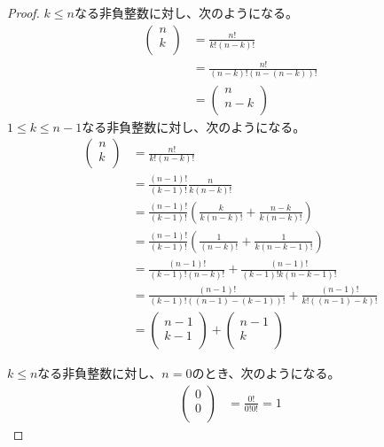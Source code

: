 \documentclass[dvipdfmx]{jsarticle}
\begin{document}
\begin{proof} 
$k \leq n$なる非負整数に対し、次のようになる。
\begin{align*}
\begin{pmatrix}
n \\
k \\
\end{pmatrix} &= \frac{n!}{k!(n - k)!}\\
&= \frac{n!}{(n - k)!\left( n - (n - k) \right)!}\\
&= \begin{pmatrix}
n \\
n - k \\
\end{pmatrix}
\end{align*}
$1 \leq k \leq n - 1$なる非負整数に対し、次のようになる。
\begin{align*}
\begin{pmatrix}
n \\
k \\
\end{pmatrix} &= \frac{n!}{k!(n - k)!}\\
&= \frac{(n - 1)!}{(k - 1)!}\frac{n}{k(n - k)!}\\
&= \frac{(n - 1)!}{(k - 1)!}\left( \frac{k}{k(n - k)!} + \frac{n - k}{k(n - k)!} \right)\\
&= \frac{(n - 1)!}{(k - 1)!}\left( \frac{1}{(n - k)!} + \frac{1}{k(n - k - 1)!} \right)\\
&= \frac{(n - 1)!}{(k - 1)!(n - k)!} + \frac{(n - 1)!}{(k - 1)!k(n - k - 1)!}\\
&= \frac{(n - 1)!}{(k - 1)!\left( (n - 1) - (k - 1) \right)!} + \frac{(n - 1)!}{k!\left( (n - 1) - k \right)!}\\
&= \begin{pmatrix}
n - 1 \\
k - 1 \\
\end{pmatrix} + \begin{pmatrix}
n - 1 \\
k \\
\end{pmatrix}
\end{align*}\par
$k \leq n$なる非負整数に対し、$n = 0$のとき、次のようになる。
\begin{align*}
\begin{pmatrix}
0 \\
0 \\
\end{pmatrix} &= \frac{0!}{0!0!} = 1

\end{align*}
\end{proof}
\end{document}
